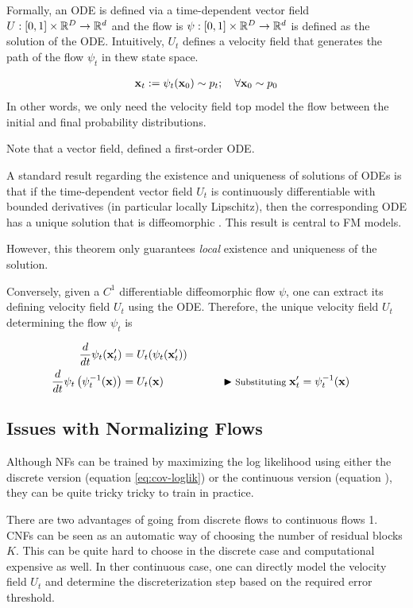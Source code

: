 \documentclass[a4paper, 11pt]{article}
\begin{document}
Formally, an ODE is defined via a time-dependent vector field $U:[0, 1] \times \mathbb{R}^D \to \mathbb{R}^d$ and the flow is $\psi:[0,1] \times \mathbb{R}^D \to \mathbb{R}^d$ is defined as the solution of the ODE. Intuitively, $U_t$ defines a velocity field that generates the path of the flow $\psi_t$ in thew state space. 

\begin{align}
    \mbox{$\mbox{$\mathbf{x}$}$}_t := \psi_t(\mbox{$\mbox{$\mathbf{x}$}$}_0) \sim p_t; \quad \forall \mbox{$\mbox{$\mathbf{x}$}$}_0 \sim p_0
\end{align}
In other words, we only need the velocity field top model the flow between the initial and final probability distributions.

Note that a vector field, defined a first-order ODE.

A standard result regarding the existence and uniqueness of solutions of ODEs is that if the time-dependent vector field $U_t$ is continuously differentiable with bounded derivatives (in particular locally Lipschitz), then the corresponding ODE has a unique solution that is diffeomorphic \citep{perko2013differential}. This result is central to FM models. 

However, this theorem only guarantees \textit{local} existence and uniqueness of the solution. 

Conversely, given a $C^1$ differentiable diffeomorphic flow $\psi$, one can extract its defining velocity field $U_t$ using the ODE. Therefore, the unique velocity field $U_t$ determining the flow $\psi_t$ is 

\begin{align}
    \frac{d}{dt}\psi_t(\mbox{$\mbox{$\mathbf{x}$}$}'_t) &= U_t(\psi_t(\mbox{$\mbox{$\mathbf{x}$}$}'_t))\\
    \frac{d}{dt}\psi_t \left (\psi_t^{-1}(\mbox{$\mbox{$\mathbf{x}$}$}) \right) &= U_t(\mbox{$\mbox{$\mathbf{x}$}$}) && \qquad \blacktriangleright\text{\footnotesize Substituting }\mbox{$\mbox{$\mathbf{x}$}$}'_t = \psi_t^{-1}(\mbox{$\mbox{$\mathbf{x}$}$})
\end{align}


\subsection{Issues with Normalizing Flows}
Although NFs can be trained by maximizing the log likelihood using either the discrete version (equation \eqref{eq:cov-loglik}) or the continuous version (equation ), they can be quite tricky tricky to train in practice. 


There are two advantages of going from discrete flows to continuous flows
1. CNFs can be seen as an automatic way of choosing the number of residual blocks $K$. This can be quite hard to choose in the discrete case and computational expensive as well. In ther continuous case, one can directly model the velocity field $U_t$ and determine the discreterization step based on the required error threshold.
\end{document}
